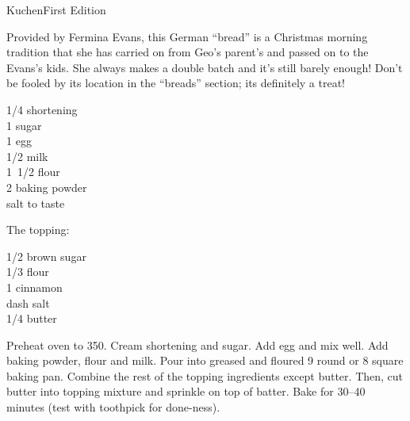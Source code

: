 \begin{entry}{Kuchen}{First Edition}

\begin{open}
  Provided by Fermina Evans, this German ``bread'' is a Christmas morning
  tradition that she has carried on from Geo's parent's and passed on to the
  Evans's kids. She always makes a double batch and it's still barely enough!
  Don't be fooled by its location in the ``breads'' section; its definitely a
  treat!
\end{open}
\begin{ingredients}
  \SI{1/4}{\cup} shortening\\
  \SI{1}{\cup} sugar \\
  1 egg \\
  \SI{1/2}{\cup} milk \\
  \SI{1/2}[1]{\cup} flour \\
  \SI{2}{\teaspoon} baking powder \\
  salt to taste
\end{ingredients}
The topping:
\begin{ingredients}
  \SI{1/2}{\cup} brown sugar \\
  \SI{1/3}{\cup} flour \\
  \SI{1}{\teaspoon} cinnamon \\
  dash salt\\
  \SI{1/4}{\cup} butter
\end{ingredients}
Preheat oven to \SI{350}{\degreeF}. Cream shortening and sugar. Add egg and mix
well.  Add baking powder, flour and milk. Pour into greased and floured
\SI{9}{\inch} round or \SI{8}{\inch} square baking pan. Combine the rest of
the topping ingredients except butter. Then, cut butter into topping mixture
and sprinkle on top of batter. Bake for \numrange{30}{40} minutes (test with
toothpick for done-ness).
\end{entry}

